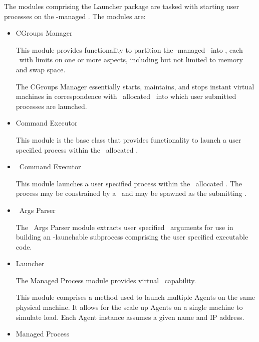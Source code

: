 \begin{itemize}
    The modules comprising the Launcher package are tasked with
    starting user processes on the \varAgent-managed \varNodeMachineComputer.
    The modules are:
            
    \begin{itemize}
      \item CGroups Manager
      
      This module provides functionality to partition the \varAgent-managed
      \varNodeMachineComputer~into \varShares, each \varShare~with limits on one
      or more aspects, including but not limited to memory and swap space. 
      
      The CGroups Manager essentially starts, maintains, and stops instant
      virtual machines in correspondence with \varResourceManager~allocated
      \varShares~into which user submitted processes are launched.
      
      \item Command Executor
      
      This module is the base class that provides functionality to
      launch a user specified process within the 
      \varResourceManager~allocated \varShare. 
      
      \item \varDUCC~Command Executor
      
      This module launches a user specified process within the 
      \varResourceManager~allocated \varShare. 
      The process may be constrained by a \varLinuxControlGroup~and
      may be spawned as the submitting \varUser.
      
      \item \varJVM~Args Parser
      
      The \varJVM~Args Parser module extracts user specified \varJVM~arguments
      for use in building an \varAgent-launchable subprocess comprising
      the user specified executable code.
      
      \item Launcher
      
      The Managed Process module provides virtual \varAgent~capability.
      
      This module comprises a method used to launch multiple Agents
      on the same physical machine. 
      It allows for the scale up Agents on a single machine to simulate load.
      Each Agent instance assumes a given name and IP address.
      
      \item Managed Process


\end{itemize}
\end{itemize}

